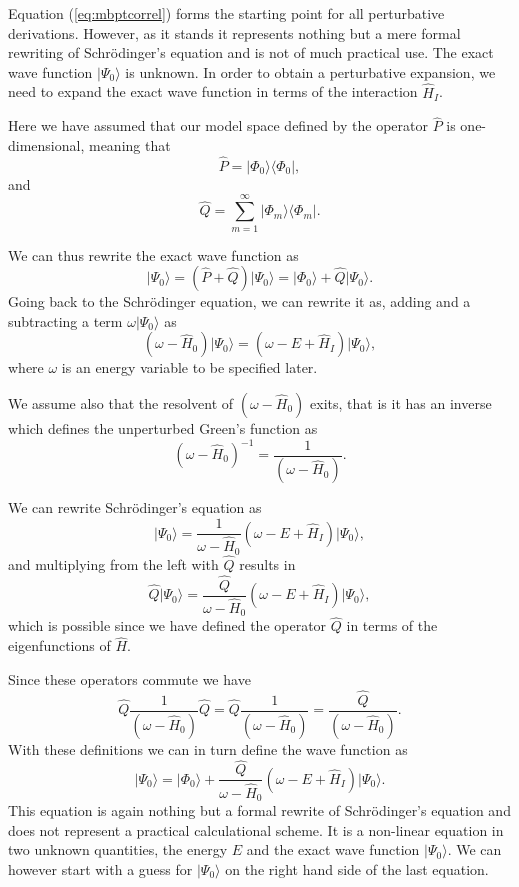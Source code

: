   Equation (\ref{eq:mbptcorrel}) forms the starting point for all perturbative
  derivations. However, as it stands it represents nothing but a mere
  formal rewriting of Schr\"odinger's equation and is not of much
  practical use. The exact wave function $\vert \Psi_0\rangle$ is
  unknown. In order to obtain a perturbative expansion, we need to
  expand the exact wave function in terms of the interaction
  $\hat{H}_I$.

  Here we have assumed that our model space defined by the operator
  $\hat{P}$ is one-dimensional, meaning that
  \[
  \hat{P}= \vert \Phi_0\rangle \langle \Phi_0\vert ,
  \]
  and
  \[
  \hat{Q}=\sum_{m=1}^{\infty}\vert \Phi_m\rangle \langle \Phi_m\vert .
  \]


  We can thus rewrite the exact wave function as
  \[
  \vert \Psi_0\rangle= (\hat{P}+\hat{Q})\vert \Psi_0\rangle=\vert
  \Phi_0\rangle+\hat{Q}\vert \Psi_0\rangle.
  \]
  Going back to the Schr\"odinger equation, we can rewrite it as,
  adding and a subtracting a term $\omega \vert \Psi_0\rangle$ as
  \[
  \left(\omega-\hat{H}_0\right)\vert
  \Psi_0\rangle=\left(\omega-E+\hat{H}_I\right)\vert \Psi_0\rangle,
  \]
  where $\omega$ is an energy variable to be specified later.


  We assume also that the resolvent of $\left(\omega-\hat{H}_0\right)$
  exits, that is it has an inverse which defines the unperturbed
  Green's function as
  \[
  \left(\omega-\hat{H}_0\right)^{-1}=\frac{1}{\left(\omega-\hat{H}_0\right)}.
  \]

  We can rewrite Schr\"odinger's equation as
  \[
  \vert
  \Psi_0\rangle=\frac{1}{\omega-\hat{H}_0}\left(\omega-E+\hat{H}_I\right)\vert
  \Psi_0\rangle,
  \]
  and multiplying from the left with $\hat{Q}$ results in
  \[
  \hat{Q}\vert
  \Psi_0\rangle=\frac{\hat{Q}}{\omega-\hat{H}_0}\left(\omega-E+\hat{H}_I\right)\vert
  \Psi_0\rangle,
  \]
  which is possible since we have defined the operator $\hat{Q}$ in
  terms of the eigenfunctions of $\hat{H}$.

 Since these operators commute we have
  \[
  \hat{Q}\frac{1}{\left(\omega-\hat{H}_0\right)}\hat{Q}=\hat{Q}\frac{1}{\left(\omega-\hat{H}_0\right)}=\frac{\hat{Q}}{\left(\omega-\hat{H}_0\right)}.
  \]
  With these definitions we can in turn define the wave function as
  \[
  \vert \Psi_0\rangle=\vert
  \Phi_0\rangle+\frac{\hat{Q}}{\omega-\hat{H}_0}\left(\omega-E+\hat{H}_I\right)\vert
  \Psi_0\rangle.
  \]
  This equation is again nothing but a formal rewrite of
  Schr\"odinger's equation and does not represent a practical
  calculational scheme.  It is a non-linear equation in two unknown
  quantities, the energy $E$ and the exact wave function $\vert
  \Psi_0\rangle$. We can however start with a guess for $\vert
  \Psi_0\rangle$ on the right hand side of the last equation.



